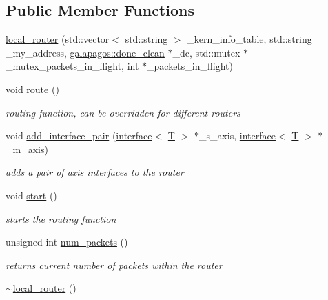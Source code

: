 \subsection*{Public Member Functions}
\begin{DoxyCompactItemize}
\item 
\hyperlink{classgalapagos_1_1local__router_a95bf5a1492b589c6ad1c1e5b8126620b}{local\+\_\+router} (std\+::vector$<$ std\+::string $>$ \+\_\+kern\+\_\+info\+\_\+table, std\+::string \+\_\+my\+\_\+address, \hyperlink{classgalapagos_1_1done__clean}{galapagos\+::done\+\_\+clean} $\ast$\+\_\+dc, std\+::mutex $\ast$\+\_\+mutex\+\_\+packets\+\_\+in\+\_\+flight, int $\ast$\+\_\+packets\+\_\+in\+\_\+flight)
\item 
void \hyperlink{classgalapagos_1_1local__router_a339b257abeb779a8809fa1f3cc07098c}{route} ()
\begin{DoxyCompactList}\small\item\em routing function, can be overridden for different routers \end{DoxyCompactList}\item 
void \hyperlink{classgalapagos_1_1local__router_a61fd9df9515ef8ca23708c2cfbead0d3}{add\+\_\+interface\+\_\+pair} (\hyperlink{classgalapagos_1_1interface}{interface}$<$ \hyperlink{test_8cpp_a0658ceffa730c765d449bb3d21871b5f}{T} $>$ $\ast$\+\_\+s\+\_\+axis, \hyperlink{classgalapagos_1_1interface}{interface}$<$ \hyperlink{test_8cpp_a0658ceffa730c765d449bb3d21871b5f}{T} $>$ $\ast$\+\_\+m\+\_\+axis)
\begin{DoxyCompactList}\small\item\em adds a pair of axis interfaces to the router \end{DoxyCompactList}\item 
void \hyperlink{classgalapagos_1_1local__router_a6ad5a95b31f855ba820157ad4439589e}{start} ()
\begin{DoxyCompactList}\small\item\em starts the routing function \end{DoxyCompactList}\item 
unsigned int \hyperlink{classgalapagos_1_1local__router_a3fdc08b885d2166561d1bc43cfe10e4e}{num\+\_\+packets} ()
\begin{DoxyCompactList}\small\item\em returns current number of packets within the router \end{DoxyCompactList}\item 
\hyperlink{classgalapagos_1_1local__router_aabb643170b5f3c8a069e5cbd191a1542}{$\sim$local\+\_\+router} ()
\end{DoxyCompactItemize}
